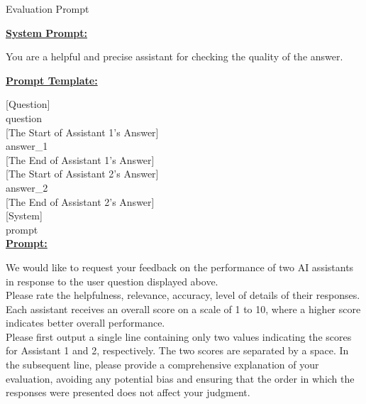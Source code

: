 \begin{AIBox}{Evaluation Prompt}

	\textbf{\underline{System Prompt:}}

	You are a helpful and precise assistant for checking the quality of the answer.

	\textbf{\underline{Prompt Template:}}

	[Question]\\

	{question}\\

	[The Start of Assistant 1's Answer]\\

	{answer\_1}\\

	[The End of Assistant 1's Answer]\\

	[The Start of Assistant 2's Answer]\\

	{answer\_2}\\

	[The End of Assistant 2's Answer]\\

	[System]\\

	{prompt}\\

	\textbf{\underline{Prompt:} }

	We would like to request your feedback on the performance of two AI assistants in response to the user question displayed above.\\Please rate the helpfulness, relevance, accuracy, level of details of their responses. Each assistant receives an overall score on a scale of 1 to 10, where a higher score indicates better overall performance.\\Please first output a single line containing only two values indicating the scores for Assistant 1 and 2, respectively. The two scores are separated by a space. In the subsequent line, please provide a comprehensive explanation of your evaluation, avoiding any potential bias and ensuring that the order in which the responses were presented does not affect your judgment.
\end{AIBox}

\clearpage

